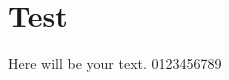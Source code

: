 \documentclass[a5paper,fontsize=12]{scrreprt}
\begin{document}
\chapter{Test}
Here will be your text. 0123456789
\end{document}
